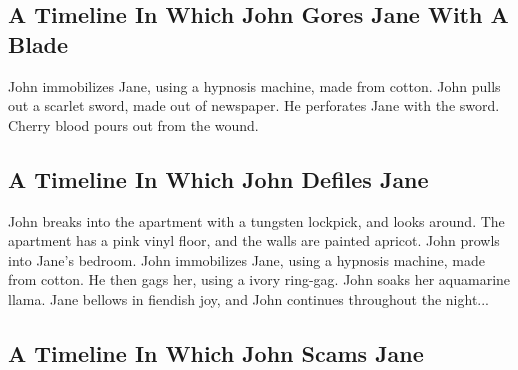 \documentclass{article}
\begin{document}
\subsection{A Timeline In Which John Gores Jane With A Blade}


John immobilizes Jane, using a hypnosis machine, made from cotton.
John pulls out a scarlet sword, made out of newspaper.
He perforates Jane with the sword.
Cherry blood pours out from the wound.
\subsection{A Timeline In Which John Defiles Jane}


John breaks into the apartment with a tungsten lockpick, and looks around.
The apartment has a pink vinyl floor, and the walls are painted apricot.
John prowls into Jane's bedroom.
John immobilizes Jane, using a hypnosis machine, made from cotton.
He then gags her, using a ivory ring{-}gag.
John soaks her aquamarine llama.
Jane bellows in fiendish joy, and John continues throughout the night...
\subsection{A Timeline In Which John Scams Jane}
\end{document}
